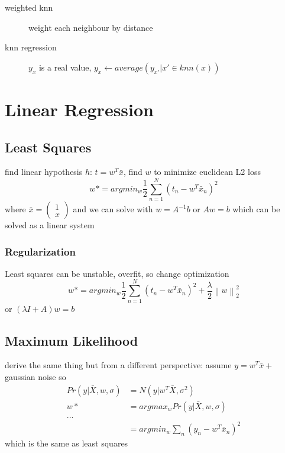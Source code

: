 \documentclass[]{article}
\theoremstyle{definition}
\newcommand\norm[1]{\left\lVert#1\right\rVert}
\begin{document}
    \begin{description}
        \item[weighted knn] weight each neighbour by distance
        \item[knn regression] $y_x$ is a real value, $ y_x \leftarrow average({y_{x'}|x' \in knn(x)})$
    \end{description}

    \section{Linear Regression}
    \label{sec:linear_regression}
    
    \subsection{Least Squares}
    \label{sub:introduction}

    find linear hypothesis $h$: $t = w^T \bar x$, find $w$ to minimize euclidean L2 loss
    \begin{equation*}
        w* = argmin_w \frac{1}{2} \sum_{n=1}^N (t_n - w^T \bar x_n)^2
    \end{equation*}
    where 
$ \bar x = \begin{pmatrix} 1 \\ x \end{pmatrix} $ and we can solve with $w = A^{-1} b$ or $Aw = b$ which can be solved as a linear system

    \subsubsection{Regularization}
    \label{ssub:Regularization}
    Least squares can be unstable, overfit, so change optimization
    \begin{equation*}
        w* = argmin_w \frac{1}{2} \sum_{n=1}^N (t_n - w^T \bar x_n)^2 + \frac{\lambda}{2} \norm{w}^2_2
    \end{equation*}
    or $(\lambda I + A)w = b$

    \subsection{Maximum Likelihood}
    \label{sub:maximum_likelihood}
    derive the same thing but from a different perspective: assume $y = w^T \bar x + $ gaussian noise so
    \begin{align*}
        Pr(y | \bar X, w, \sigma) &= N(y | w^T \bar X, \sigma^2) \\
        w* &= argmax_w Pr(y | \bar X, w, \sigma)  \\
            ... \\
           &= argmin_w \sum_n (y_n - w^T \bar x_n)^2 
    \end{align*}
    which is the same as least squares
    
\end{document}
